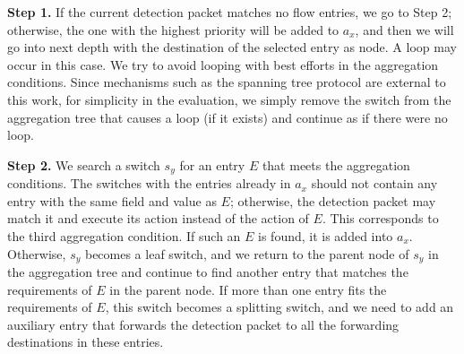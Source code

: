 \documentclass[conference]{IEEEtran}
\begin{document}
%
%      

\textbf{Step 1.} If the current detection packet matches no flow entries, we go to Step 2; otherwise, the one with the highest priority will be added to $a_x$, and then we will go into next depth with the destination of the selected entry as node. A loop may occur in this case. We try to avoid looping with best efforts in the aggregation conditions. Since mechanisms such as the spanning tree protocol are external to this work, for simplicity in the evaluation, we simply remove the switch from the aggregation tree that causes a loop (if it exists) and continue as if there were no loop.

\textbf{Step 2.}
We search a switch $s_y$ for an entry $E$ that meets the aggregation conditions. The switches with the entries already in $a_x$ should not contain any entry with the same field and value as $E$; otherwise, the detection packet may match it and execute its action instead of the action of $E$. This corresponds to the third aggregation condition. If such an $E$ is found, it is added into $a_x$. Otherwise, $s_y$ becomes a leaf switch, and we return to the parent node of $s_y$ in the aggregation tree and continue to find another entry that matches the requirements of $E$ in the parent node. If more than one entry fits the requirements of $E$, this switch becomes a splitting switch, and we need to add an auxiliary entry that forwards the detection packet to all the forwarding destinations in these entries.
\end{document}
